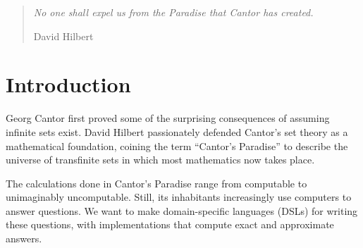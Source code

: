 
\newcommand{\targetlang}{\lzfclang}
\newcommand{\ftargetlang}{\ensuremath{\lambda_{\mathrm{ZFC}}^-}\xspace}

\theoremstyle{definition}
\newtheorem{axiom}{Axiom}

\begin{comment}
\begin{abstract}
Applied mathematicians increasingly use computers to answer mathematical questions. We want to provide them domain-specific languages.
The languages should have exact meanings and computational meanings.
Some proof assistants can encode exact mathematics and extract programs, but formalizing the required theorems can take years.

As an alternative, we develop \targetlang, a lambda calculus that contains infinite sets as values, in which to express exact mathematics and gradually change infinite calculations to computable ones. We define it as a conservative extension of set theory, and prove that most contemporary theorems apply directly to \targetlang terms.

We demonstrate \targetlang's expressiveness by coding up the real numbers, arithmetic and limits. We demonstrate that it makes deriving computational meaning easier by defining a monad in it for expressing limits, and using standard topological theorems to derive a computable replacement.
\end{abstract}
\keywords Lambda Calculus, Set Theory, Semantics
\end{comment}

\begin{quote}
\textit{No one shall expel us from the Paradise that Cantor has created.}

\hfill David Hilbert
\end{quote}

\section{Introduction}

Georg Cantor first proved some of the surprising consequences of assuming infinite sets exist.
David Hilbert passionately defended Cantor's set theory as a mathematical foundation, coining the term ``Cantor's Paradise'' to describe the universe of transfinite sets in which most mathematics now takes place.

The calculations done in Cantor's Paradise range from computable to unimaginably uncomputable. Still, its inhabitants increasingly use computers to answer questions. We want to make domain-specific languages (DSLs) for writing these questions, with implementations that compute exact and approximate answers.

